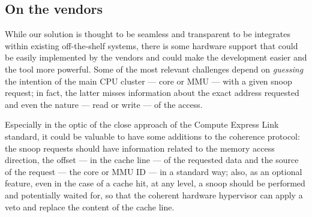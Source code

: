     \subsection{On the vendors}
        \label{subsec:on_the_vendors}
        
        While our solution is thought to be seamless and transparent to be integrates within existing off-the-shelf systems, there is some hardware support that could be easily implemented by the vendors and could make the development easier and the tool more powerful.
        Some of the most relevant challenges depend on \textit{guessing} the intention of the main CPU cluster --- core or MMU --- with a given snoop request; in fact, the latter misses information about the exact address requested and even the nature --- read or write --- of the access.
        
        Especially in the optic of the close approach of the Compute Express Link standard, it could be valuable to have some additions to the coherence protocol:
        the snoop requests should have information related to the \ci memory access direction, \cii the offset --- in the cache line --- of the requested data and \ciii the source of the request --- \ie the core or MMU ID --- in a standard way; also, as an optional feature, \civ even in the case of a cache hit, at any level, a snoop should be performed and potentially waited for, so that the coherent hardware hypervisor can apply a veto and replace the content of the cache line.
